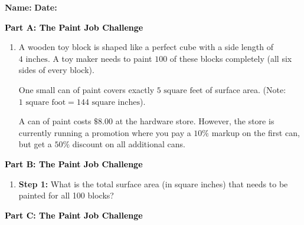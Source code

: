 \documentclass[12pt, letterpaper, fleqn]{article}
\begin{document}
\textbf{Name:} \underline{\hspace{5cm}}
\hfill
\textbf{Date:} \underline{\hspace{3cm}}\\

\begin{tcolorbox}[colback=customteal!20]
\large\textcolor{black}{\textbf{Part A: The Paint Job Challenge}}
\end{tcolorbox}

\vspace{3mm}

\begin{enumerate}[itemsep=5.5cm, leftmargin=0.6cm]
\item A wooden toy block is shaped like a perfect cube with a side length of $4\text{ inches}$. A toy maker needs to paint $100$ of these blocks completely (all six sides of every block). 

One small can of paint covers exactly $5\text{ square feet}$ of surface area. (Note: $1\text{ square foot} = 144\text{ square inches}$).

A can of paint costs $\$8.00$ at the hardware store. However, the store is currently running a promotion where you pay a $10\%$ markup on the first can, but get a $50\%$ discount on all additional cans.

\end{enumerate}

\newpage

\begin{tcolorbox}[colback=customteal!20]
\large\textcolor{black}{\textbf{Part B: The Paint Job Challenge}}
\end{tcolorbox}

\vspace{3mm}

\begin{enumerate}[itemsep=5.5cm, leftmargin=0.6cm, resume]
\item \textbf{Step 1:} What is the total surface area (in square inches) that needs to be painted for all 100 blocks?
\end{enumerate}

\newpage

\begin{tcolorbox}[colback=customteal!20]
\large\textcolor{black}{\textbf{Part C: The Paint Job Challenge}}
\end{tcolorbox}
\end{document}
